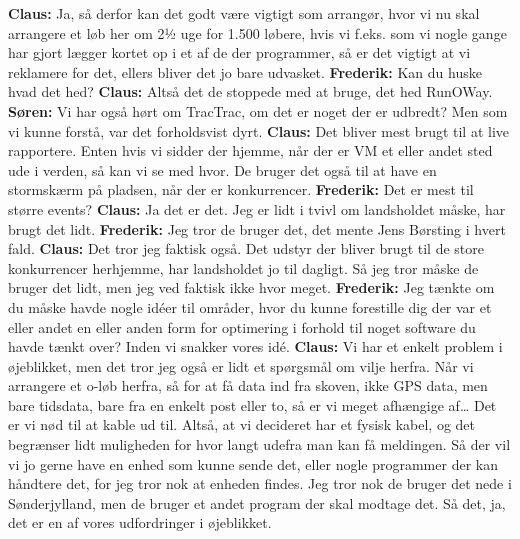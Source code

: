 \textbf{Claus:} Ja, så derfor kan det godt være vigtigt som arrangør, hvor vi nu skal arrangere et løb her om 2½ uge for 1.500 løbere, hvis vi f.eks. som vi nogle gange har gjort lægger kortet op i et af de der programmer, så er det vigtigt at vi reklamere for det, ellers bliver det jo bare udvasket. \newline
\textbf{Frederik:} Kan du huske hvad det hed?\newline
\textbf{Claus:} Altså det de stoppede med at bruge, det hed RunOWay.\newline
\textbf{Søren:} Vi har også hørt om TracTrac, om det er noget der er udbredt? Men som vi kunne forstå, var det forholdsvist dyrt. \newline
\textbf{Claus:} Det bliver mest brugt til at live rapportere. Enten hvis vi sidder der hjemme, når der er VM et eller andet sted ude i verden, så kan vi se med hvor. De bruger det også til at have en stormskærm på pladsen, når der er konkurrencer. \newline
\textbf{Frederik:} Det er mest til større events?\newline
\textbf{Claus:} Ja det er det. Jeg er lidt i tvivl om landsholdet måske, har brugt det lidt.\newline
\textbf{Frederik:} Jeg tror de bruger det, det mente Jens Børsting i hvert fald.\newline
\textbf{Claus:} Det tror jeg faktisk også. Det udstyr der bliver brugt til de store konkurrencer herhjemme, har landsholdet jo til dagligt. Så jeg tror måske de bruger det lidt, men jeg ved faktisk ikke hvor meget.\newline 
\textbf{Frederik:} Jeg tænkte om du måske havde nogle idéer til områder, hvor du kunne forestille dig der var et eller andet en eller anden form for optimering i forhold til noget software du havde tænkt over? Inden vi snakker vores idé. \newline
\textbf{Claus:} Vi har et enkelt problem i øjeblikket, men det tror jeg også er lidt et spørgsmål om vilje herfra. Når vi arrangere et o-løb herfra, så for at få data ind fra skoven, ikke GPS data, men bare tidsdata, bare fra en enkelt post eller to, så er vi meget afhængige af… Det er vi nød til at kable ud til. Altså, at vi decideret har et fysisk kabel, og det begrænser lidt muligheden for hvor langt udefra man kan få meldingen. Så der vil vi jo gerne have en enhed som kunne sende det, eller nogle programmer der kan håndtere det, for jeg tror nok at enheden findes. Jeg tror nok de bruger det nede i Sønderjylland, men de bruger et andet program der skal modtage det. Så det, ja, det er en af vores udfordringer i øjeblikket. \newline
